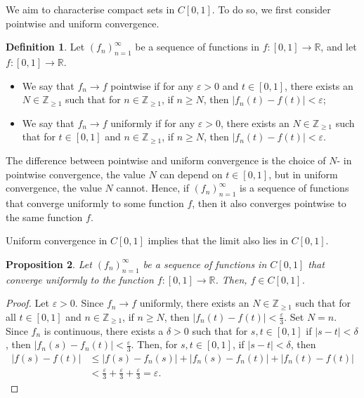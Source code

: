 \documentclass[a4paper, openany]{memoir}
\theoremstyle{definition}
\newtheorem{definition}{Definition}[section]
\theoremstyle{plain}
\newtheorem{proposition}[definition]{Proposition}
\begin{document}
    We aim to characterise compact sets in $C[0, 1]$. To do so, we first consider pointwise and uniform convergence.
    \begin{definition}
        Let $(f_n)_{n=1}^\infty$ be a sequence of functions in $f \colon [0, 1] \to \mathbb{R}$, and let $f \colon [0, 1] \to \mathbb{R}$. 
        \begin{itemize}
            \item We say that $f_n \to f$ pointwise if for any $\varepsilon > 0$ and $t \in [0, 1]$, there exists an $N \in \mathbb{Z}_{\geq 1}$ such that for $n \in \mathbb{Z}_{\geq 1}$, if $n \geq N$, then $|f_n(t) - f(t)| < \varepsilon$;
            \item We say that $f_n \to f$ uniformly if for any $\varepsilon > 0$, there exists an $N \in \mathbb{Z}_{\geq 1}$ such that for $t \in [0, 1]$ and $n \in \mathbb{Z}_{\geq 1}$, if $n \geq N$, then $|f_n(t) - f(t)| < \varepsilon$.
        \end{itemize}
    \end{definition}
    \noindent The difference between pointwise and uniform convergence is the choice of $N$- in pointwise convergence, the value $N$ can depend on $t \in [0, 1]$, but in uniform convergence, the value $N$ cannot. Hence, if $(f_n)_{n=1}^\infty$ is a sequence of functions that converge uniformly to some function $f$, then it also converges pointwise to the same function $f$.

    Uniform convergence in $C[0, 1]$ implies that the limit also lies in $C[0, 1]$.
    \begin{proposition}
        Let $(f_n)_{n=1}^\infty$ be a sequence of functions in $C[0, 1]$ that converge uniformly to the function $f \colon [0, 1] \to \mathbb{R}$. Then, $f \in C[0, 1]$.
    \end{proposition}
    \begin{proof}
        Let $\varepsilon > 0$. Since $f_n \to f$ uniformly, there exists an $N \in \mathbb{Z}_{\geq 1}$ such that for all $t \in [0, 1]$ and $n \in \mathbb{Z}_{\geq 1}$, if $n \geq N$, then $|f_n(t) - f(t)| < \frac{\varepsilon}{3}$. Set $N = n$. Since $f_n$ is continuous, there exists a $\delta > 0$ such that for $s, t \in [0, 1]$ if $|s - t| < \delta$, then $|f_n(s) - f_n(t)| < \frac{\varepsilon}{3}$. Then, for $s, t \in [0, 1]$, if $|s - t| < \delta$, then
        \begin{align*}
            |f(s) - f(t)| &\leq |f(s) - f_n(s)| + |f_n(s) - f_n(t)| + |f_n(t) - f(t)| \\
            &< \frac{\varepsilon}{3} + \frac{\varepsilon}{3} + \frac{\varepsilon}{3} = \varepsilon.
        \end{align*}
    \end{proof}
\end{document}
